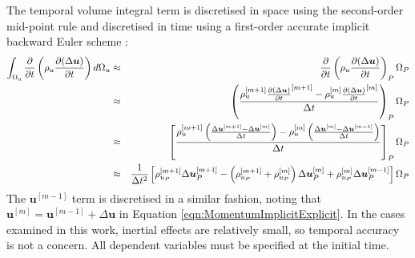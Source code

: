 \documentclass[sn-mathphys,Numbered]{sn-jnl}%
\newcommand{\bb}{\boldsymbol}
\begin{document}
 The temporal volume integral term is discretised in space using the second-order mid-point rule and discretised in time using a first-order accurate implicit backward Euler scheme \cite{jasak_application_2000}:
\begin{eqnarray} \label{eq:timeTerm}
	\int_{\mathrm{\Omega_u}} \frac{\partial }{\partial t} \left( \rho_u \frac{\partial (\Delta \bb{u}) }{\partial t} \right) d\mathrm{\Omega}_u
	&\approx&
	\frac{\partial }{\partial t} \left( \rho_u \frac{\partial (\Delta \bb{u}) }{\partial t} \right)_P \mathrm{\Omega}_P \notag \\
	&\approx&
	\left(
	\frac{ \rho_u^{[m+1]} \frac{\partial (\Delta \bb{u}) }{\partial t}^{[m+1]}
	- \rho_u^{[m]} \frac{\partial (\Delta \bb{u}) }{\partial t}^{[m]}}{ \Delta t } \right)_P
	\mathrm{\Omega}_P \notag \\
	&\approx&
	\left[
	\frac{ \rho_u^{[m+1]} \left(\frac{\Delta \bb{u}^{[m+1]} - \Delta \bb{u}^{[m]}}{\Delta t} \right)
	- \rho_u^{[m]} \left(\frac{\Delta \bb{u}^{[m]} - \Delta \bb{u}^{[m-1]}}{\Delta t} \right)
	}{ \Delta t } 
	\right]_P \mathrm{\Omega}_P \notag \\
	&\approx&
	\frac{1}{\Delta t^2} \left[
	 \rho_{u_P}^{[m+1]} \Delta \bb{u}^{[m+1]}_P
	- \left(\rho_{u_P}^{[m+1]} + \rho_{u_P}^{[m]} \right)  \Delta \bb{u}^{[m]}_P
	+ \rho_{u_P}^{[m]}  \Delta \bb{u}^{[m-1]}_P
	\right]
	 \mathrm{\Omega}_P \notag \\
\end{eqnarray}
The $\boldsymbol{u}^{[m-1]}$ term is discretised in a similar fashion, noting that $\boldsymbol{u}^{[m]} = \boldsymbol{u}^{[m-1]} + \Delta \boldsymbol{u}$ in Equation \ref{eqn:MomentumImplicitExplicit}.
In the cases examined in this work, inertial effects are relatively small, so temporal accuracy is not a concern.
All dependent variables must be specified at the initial time.
\end{document}

